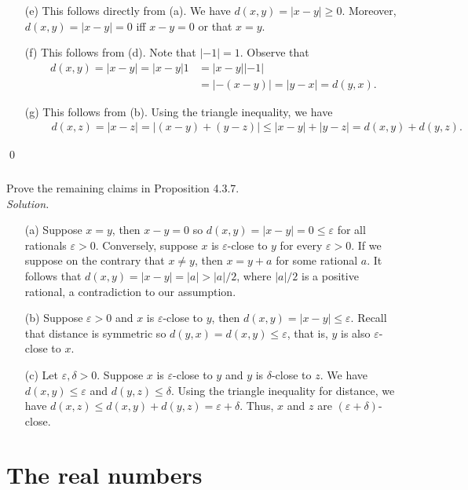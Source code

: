 \documentclass{amsart}
\theoremstyle{definition}
\newcommand{\soln}{\newline\textit{Solution.} }
\begin{document}
\begin{enumerate}
\item[(e)] This follows directly from (a). We have $d(x,y)=|x-y|\geq 0$. Moreover, $d(x,y)=|x-y|=0$ iff $x-y=0$ or that $x=y$.
\item[(f)] This follows from (d). Note that $|-1|=1$. Observe that \begin{align*}
d(x,y)=|x-y|=|x-y|1&=|x-y||-1|\\
&=|-(x-y)|=|y-x|=d(y,x).
\end{align*}
\item[(g)] This follows from (b). Using the triangle inequality, we have
\begin{align*}
\qquad d(x,z)=|x-z|=|(x-y)+(y-z)|\leq |x-y|+|y-z|=d(x,y)+d(y,z). 
\end{align*}
\end{enumerate} \qed\\

\subsubsection{} Prove the remaining claims in Proposition 4.3.7. \\
\soln 
\begin{enumerate}
\item[(a)] Suppose $x=y$, then $x-y=0$ so $d(x,y)=|x-y|=0\leq\varepsilon$ for all rationals $\varepsilon>0$. Conversely, suppose $x$ is $\varepsilon$-close to $y$ for every $\varepsilon>0$. If we suppose on the contrary that $x\neq y$, then $x=y+a$ for some rational $a$. It follows that $d(x,y)=|x-y|=|a|>|a|/2$, where $|a|/2$ is a positive rational, a contradiction to our assumption.
\item[(b)] Suppose $\varepsilon>0$ and $x$ is $\varepsilon$-close to $y$, then $d(x,y)=|x-y|\leq\varepsilon$. Recall that distance is symmetric so $d(y,x)=d(x,y)\leq\varepsilon$, that is, $y$ is also $\varepsilon$-close to $x$.
\item[(c)] Let $\varepsilon,\delta>0$. Suppose $x$ is $\varepsilon$-close to $y$ and $y$ is $\delta$-close to $z$. We have $d(x,y)\leq \varepsilon$ and $d(y,z)\leq \delta$. Using the triangle inequality for distance, we have $d(x,z)\leq d(x,y)+d(y,z)=\varepsilon+\delta$. Thus, $x$ and $z$ are $(\varepsilon+\delta)$-close.
\end{enumerate}




\newpage

\section{The real numbers}
\end{document}
